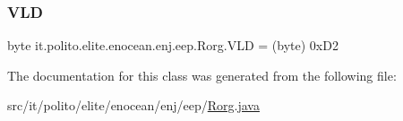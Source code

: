 \subsubsection{\texorpdfstring{V\+LD}{VLD}}
{\footnotesize\ttfamily byte it.\+polito.\+elite.\+enocean.\+enj.\+eep.\+Rorg.\+V\+LD = (byte) 0x\+D2\hspace{0.3cm}{\ttfamily [static]}}



The documentation for this class was generated from the following file\+:\begin{DoxyCompactItemize}
\item 
src/it/polito/elite/enocean/enj/eep/\hyperlink{_rorg_8java}{Rorg.\+java}\end{DoxyCompactItemize}
